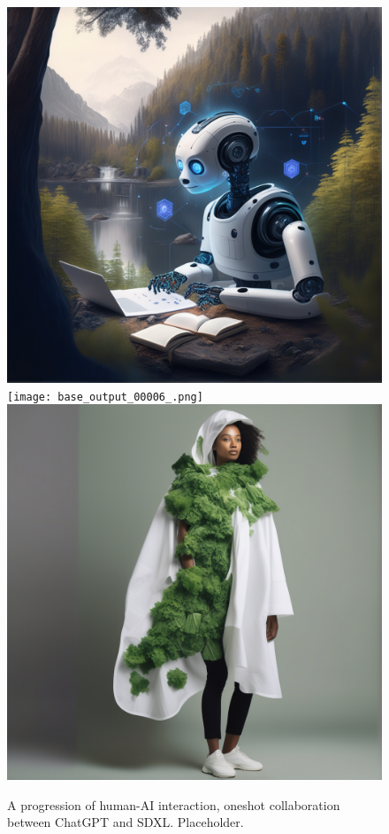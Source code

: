 \begin{figure}[ht]
\hfill
\includegraphics{base_output_00005_.png}
\hfill
\texttt{[image: base\_output\_00006\_.png]}
\hfill
\includegraphics{base_output_00007_.png}
\caption{A progression of human-AI interaction, oneshot collaboration between ChatGPT and SDXL. Placeholder.}
\end{figure}

